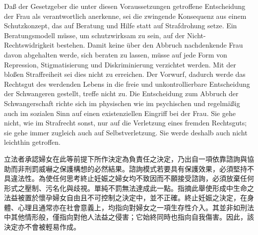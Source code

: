 \documentclass[12pt]{article}
\begin{document}
\begin{sourcepara}[title={原文C.26}]
Daß der Gesetzgeber die unter diesen Voraussetzungen getroffene Entscheidung der Frau als verantwortlich anerkenne, sei die zwingende Konsequenz aus einem Schutzkonzept, das auf Beratung und Hilfe statt auf Strafdrohung setze. Ein Beratungsmodell müsse, um schutzwirksam zu sein, auf der Nicht-Rechtswidrigkeit bestehen. Damit keine über den Abbruch nachdenkende Frau davon abgehalten werde, sich beraten zu lassen, müsse auf jede Form von Repression, Stigmatisierung und Diskriminierung verzichtet werden. Mit der bloßen Straffreiheit sei dies nicht zu erreichen. Der Vorwurf, dadurch werde das Rechtsgut des werdenden Lebens in die freie und unkontrollierbare Entscheidung der Schwangeren gestellt, treffe nicht zu. Die Entscheidung zum Abbruch der Schwangerschaft richte sich im physischen wie im psychischen und regelmäßig auch im sozialen Sinn auf einen existenziellen Eingriff bei der Frau. Sie gehe nicht, wie im Strafrecht sonst, nur auf die Verletzung eines fremden Rechtsguts; sie gehe immer zugleich auch auf Selbstverletzung. Sie werde deshalb auch nicht leichthin getroffen.
\end{sourcepara}
\begin{transpara}
立法者承認婦女在此等前提下所作決定為負責任之決定，乃出自一項依靠諮詢與協助而非刑罰威嚇之保護構想的必然結果。諮詢模式若要具有保護效果，必須堅持不具違法性。為使任何思考終止妊娠之婦女均不致因而不願接受諮詢，必須放棄任何形式之壓制、污名化與歧視。單純不罰無法達成此一點。指摘此舉使形成中生命之法益被置於懷孕婦女自由且不可控制之決定中，並不正確。終止妊娠之決定，在身體、心理且通常亦在社會意義上，均指向對婦女之一項生存性介入。其並非如刑法中其他情形般，僅指向對他人法益之侵害；它始終同時也指向自我傷害。因此，該決定亦不會被輕易作成。
\end{transpara}
\end{document}

